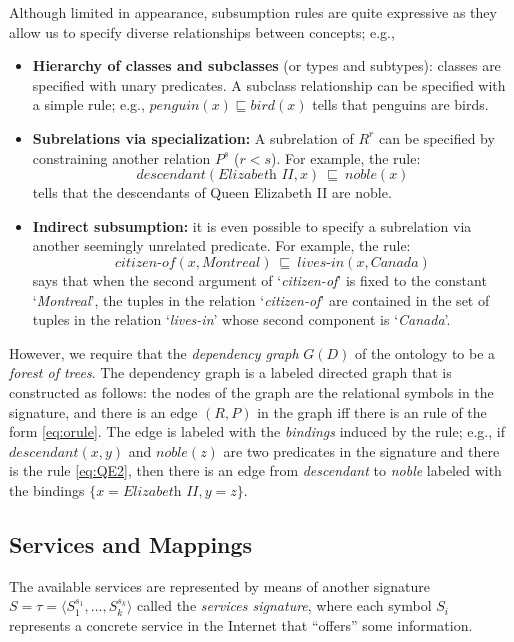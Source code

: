 \documentclass{llncs}
\newcommand{\tup}[1]{\langle #1 \rangle}
\newcommand{\orule}{\sqsubseteq}
\begin{document}
Although limited in appearance, subsumption rules are quite expressive
as they allow us to specify diverse relationships between concepts; e.g.,
\begin{itemize}
\item \textbf{Hierarchy of classes and subclasses} (or types and subtypes):
classes are specified with unary predicates. A subclass relationship can
be specified with a simple rule; e.g.,
$\textit{penguin}(x) \orule \textit{bird}(x)$ tells that penguins are birds.
\item \textbf{Subrelations via specialization:} A subrelation of $R^r$
can be specified by constraining another relation $P^s$ ($r<s$). 
For example, the rule:
\begin{equation}
\label{eq:QE2}
\textit{descendant}(\textit{Elizabeth II},x)\ \orule\ \textit{noble}(x)
\end{equation}
tells that the descendants of Queen Elizabeth II are noble.
\item \textbf{Indirect subsumption:} it is even possible to specify
a subrelation via another seemingly unrelated predicate. For example,
the rule:
\[ \textit{citizen-of}(x,\textit{Montreal})\ \orule\ \textit{lives-in}(x,\textit{Canada}) \]
says that when the second argument of `\textit{citizen-of}' is fixed to the
constant `\textit{Montreal}', the tuples in the relation `\textit{citizen-of}'
are contained in the set of tuples in the relation `\textit{lives-in}' whose
second component is `\textit{Canada}'.
\end{itemize}
However, we require that the \emph{dependency graph} $G(D)$ of the ontology
to be a \emph{forest of trees}. The dependency graph is a labeled directed
graph that is constructed as follows: the nodes of the graph are the relational
symbols in the signature, and there is an edge $(R,P)$ in the graph iff
there is an rule of the form \eqref{eq:orule}. The edge is labeled with
the \emph{bindings} induced by the rule; e.g., if $\textit{descendant}(x,y)$
and $\textit{noble}(z)$ are two predicates in the signature and there
is the rule \eqref{eq:QE2}, then there is an edge from \textit{descendant}
to \textit{noble} labeled with the bindings $\{x=\textit{Elizabeth II},y=z\}$.

\subsection{Services and Mappings}

The available services are represented by means of another signature
$S=\tau=\tup{S_1^{s_1},\ldots,S_k^{s_k}}$ called the \emph{services signature},
where each symbol $S_i$ represents a concrete service in the Internet
that ``offers'' some information.
\end{document}
